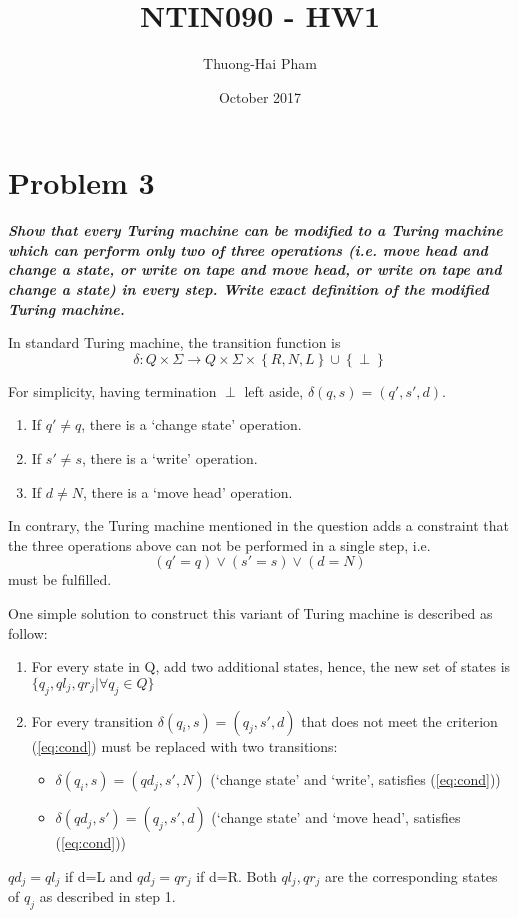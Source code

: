 \documentclass{article}
\title{NTIN090 - HW1}
\author{Thuong-Hai Pham}
\date{October 2017}
\begin{document}
\maketitle

\section{Problem 3}
\textbf{\textit{Show that every Turing machine can be modified to a Turing machine which can perform only
two of three operations (i.e. move head and change a state, or write on tape and move head, or write on tape
and change a state) in every step. Write exact definition of the modified Turing machine.}}

In standard Turing machine, the transition function is $$\delta:Q\times\Sigma\to Q\times\Sigma\times\left\{R,N,L\right\}\cup \left\{\perp\right\}$$

For simplicity, having termination $\perp$ left aside, $\delta(q, s) = (q', s', d)$.
\begin{enumerate}
    \item If $q'\ne q$, there is a `change state' operation.
    \item If $s'\ne s$, there is a `write' operation. 
    \item If $d\ne N$, there is a `move head' operation.
\end{enumerate}

In contrary, the Turing machine mentioned in the question adds a constraint that the three operations above can not be performed in a single step, i.e.
\begin{equation} \label{eq:cond}
    (q'=q)\lor(s'=s)\lor(d=N)
\end{equation} must be fulfilled.

One simple solution to construct this variant of Turing machine is described as follow:
\begin{enumerate}
    \item For every state in Q, add two additional states, hence, the new set of states is $\{q_j,ql_j,qr_j|\forall q_j \in Q\}$
    \item For every transition $\delta(q_i, s) = (q_j, s', d)$ that does not meet the criterion (\ref{eq:cond}) must be replaced with two transitions:
        \begin{itemize}
            \item $\delta(q_i, s) = (qd_j, s', N)$ (`change state' and `write', satisfies (\ref{eq:cond}))
            \item $\delta(qd_j, s') = (q_j, s', d)$ (`change state' and `move head', satisfies (\ref{eq:cond}))
        \end{itemize}
\end{enumerate}
$qd_j=ql_j$ if d=L and $qd_j=qr_j$ if d=R. Both $ql_j, qr_j$ are the corresponding states of $q_j$ as described in step 1.
\end{document}
